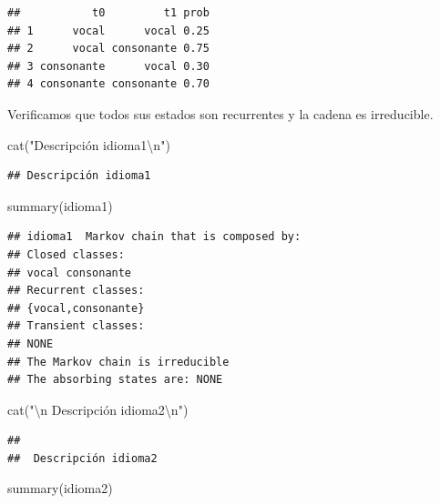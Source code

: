 \documentclass[
]{book}
\newenvironment{Shaded}{\begin{snugshade}}{\end{snugshade}}
\newcommand{\FunctionTok}[1]{\textcolor[rgb]{0.00,0.00,0.00}{#1}}
\newcommand{\NormalTok}[1]{#1}
\newcommand{\SpecialCharTok}[1]{\textcolor[rgb]{0.00,0.00,0.00}{#1}}
\newcommand{\StringTok}[1]{\textcolor[rgb]{0.31,0.60,0.02}{#1}}
\theoremstyle{definition}
\theoremstyle{definition}
\theoremstyle{definition}
\theoremstyle{definition}
\theoremstyle{remark}
\begin{document}
\begin{verbatim}
##           t0         t1 prob
## 1      vocal      vocal 0.25
## 2      vocal consonante 0.75
## 3 consonante      vocal 0.30
## 4 consonante consonante 0.70
\end{verbatim}

Verificamos que todos sus estados son recurrentes y la cadena es irreducible.

\begin{Shaded}
\begin{Highlighting}[]
\FunctionTok{cat}\NormalTok{(}\StringTok{"Descripción idioma1}\SpecialCharTok{\textbackslash{}n}\StringTok{"}\NormalTok{)}
\end{Highlighting}
\end{Shaded}

\begin{verbatim}
## Descripción idioma1
\end{verbatim}

\begin{Shaded}
\begin{Highlighting}[]
\FunctionTok{summary}\NormalTok{(idioma1)}
\end{Highlighting}
\end{Shaded}

\begin{verbatim}
## idioma1  Markov chain that is composed by: 
## Closed classes: 
## vocal consonante 
## Recurrent classes: 
## {vocal,consonante}
## Transient classes: 
## NONE 
## The Markov chain is irreducible 
## The absorbing states are: NONE
\end{verbatim}

\begin{Shaded}
\begin{Highlighting}[]
\FunctionTok{cat}\NormalTok{(}\StringTok{"}\SpecialCharTok{\textbackslash{}n}\StringTok{ Descripción idioma2}\SpecialCharTok{\textbackslash{}n}\StringTok{"}\NormalTok{)}
\end{Highlighting}
\end{Shaded}

\begin{verbatim}
## 
##  Descripción idioma2
\end{verbatim}

\begin{Shaded}
\begin{Highlighting}[]
\FunctionTok{summary}\NormalTok{(idioma2)}
\end{Highlighting}
\end{Shaded}
\end{document}
